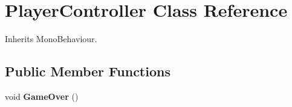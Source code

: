 \hypertarget{class_player_controller}{}\section{Player\+Controller Class Reference}
\label{class_player_controller}


Inherits Mono\+Behaviour.

\subsection*{Public Member Functions}
\begin{DoxyCompactItemize}
\item 
\mbox{\label{class_player_controller_a022c877a529497a8fdb3fcf7e21cf090}} 
void {\bfseries Game\+Over} ()
\end{DoxyCompactItemize}
